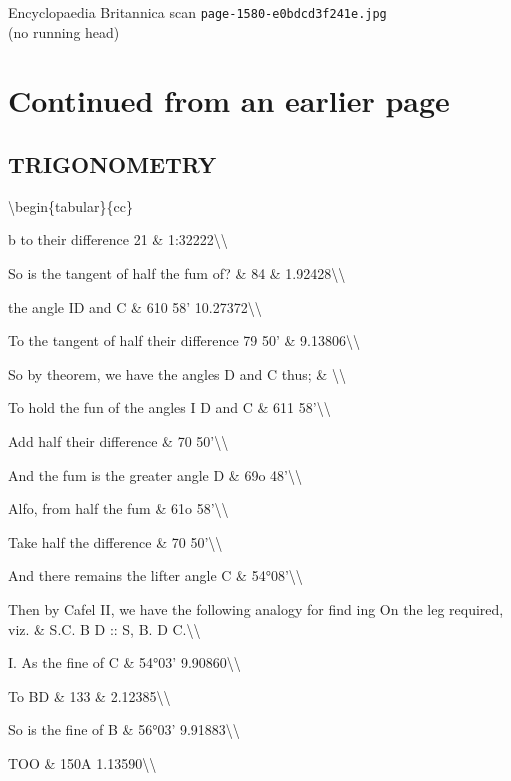 \documentclass{article}
\begin{document}
\begin{center}
{\Large Encyclopaedia Britannica scan \texttt{page-1580-e0bdcd3f241e.jpg}}\\[0.5em]
(no running head)
\end{center}
\section*{Continued from an earlier page}
\subsection*{TRIGONOMETRY}
\textbackslash{}begin\{tabular\}\{cc\}

b to their difference 21 \& 1:32222\textbackslash{}\textbackslash{}

So is the tangent of half the fum of? \& 84 \& 1.92428\textbackslash{}\textbackslash{}

the angle ID and C \& 610 58' 10.27372\textbackslash{}\textbackslash{}

To the tangent of half their difference 79 50' \& 9.13806\textbackslash{}\textbackslash{}

So by theorem, we have the angles D and C thus; \& \textbackslash{}\textbackslash{}

To hold the fun of the angles I D and C \& 611 58'\textbackslash{}\textbackslash{}

Add half their difference \& 70 50'\textbackslash{}\textbackslash{}

And the fum is the greater angle D \& 69o 48'\textbackslash{}\textbackslash{}

Alfo, from half the fum \& 61o 58'\textbackslash{}\textbackslash{}

Take half the difference \& 70 50'\textbackslash{}\textbackslash{}

And there remains the lifter angle C \& 54°08'\textbackslash{}\textbackslash{}

Then by Cafel II, we have the following analogy for find ing On the leg required, viz. \& S.C. B D :: S, B. D C.\textbackslash{}\textbackslash{}

I. As the fine of C \& 54°03' 9.90860\textbackslash{}\textbackslash{}

To BD \& 133 \& 2.12385\textbackslash{}\textbackslash{}

So is the fine of B \& 56°03' 9.91883\textbackslash{}\textbackslash{}

TOO \& 150A 1.13590\textbackslash{}\textbackslash{}
\end{document}
